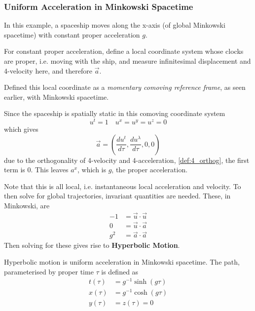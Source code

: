 \subsubsection{Uniform Acceleration in Minkowski Spacetime}
In this example, a spaceship moves along the x-axis (of global Minkowski spacetime) with constant proper acceleration $g$. \par For constant proper acceleration, define a local coordinate system whose clocks are proper, i.e. moving with the ship, and measure infinitesimal displacement and 4-velocity here, and therefore $\vec{a}$. \par
Defined this local coordinate as a \textit{momentary comoving reference frame}, as seen earlier, with Minkowski spacetime. \par Since the spaceship is spatially static in this comoving coordinate system
$$ u^t = 1 \quad u^x = u^y = u^z = 0 $$
which gives
$$ \vec{a} = \left(\frac{du^t}{d\tau}, \frac{du^\lambda}{d\tau}, 0, 0\right) $$
due to the orthogonality of 4-velocity and 4-acceleration, \vref{def:4_orthog}, the first term is $0$. This leaves $a^x$, which is $g$, the proper acceleration. \par
Note that this is all local, i.e. instantaneous local acceleration and velocity. To then solve for global trajectories, invariant quantities are needed. These, in Minkowski, are
\begin{align*}
    -1 & = \vec{u} \cdot \vec{u} \\
    0 & = \vec{u} \cdot \vec{a} \\
    g^2 & = \vec{a} \cdot \vec{a}
\end{align*}
Then solving for these gives rise to \textbf{Hyperbolic Motion}.
\begin{corollary}
    Hyperbolic motion is uniform acceleration in Minkowski spacetime. The path, parameterised by proper time $\tau$ is defined as
    \begin{align*}
        t(\tau) & = g^{-1} \sinh(g\tau) \\
        x(\tau) & = g^{-1} \cosh(g\tau) \\
        y(\tau) & = z(\tau) = 0
    \end{align*}
\end{corollary}

